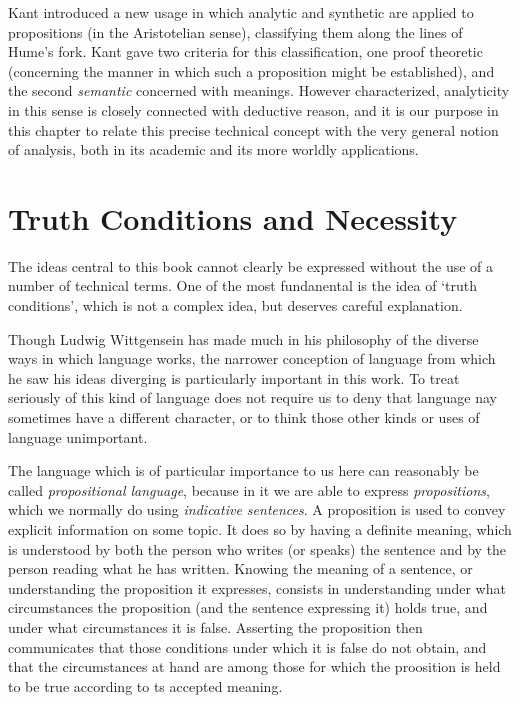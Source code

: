 Kant introduced a new usage in which analytic and
synthetic are applied to propositions (in the Aristotelian sense),
classifying them along the lines of Hume's fork. 
Kant gave two criteria for this classification, one proof theoretic
(concerning the manner in which such a proposition might be
established), and the second \emph{semantic} concerned with meanings. 
However characterized, analyticity in this sense is closely connected
with deductive reason, and it is our purpose in this chapter to relate
this precise technical concept with the very general notion of
analysis, both in its academic and its more worldly applications. 

\section{Truth Conditions and Necessity}\label{TruthConditionsAndNecessity}

The ideas central to this book cannot clearly be expressed without the use of a number of technical terms.
One of the most fundanental is the idea of `truth conditions', which is not a complex idea, but deserves careful explanation.

Though Ludwig Wittgensein has made much in his philosophy of the diverse ways in which language works, the narrower conception of language from which he saw his ideas diverging is particularly important in this work.
To treat seriously of this kind of language does not require us to deny that language nay sometimes have a different character, or to think those other kinds or uses of language unimportant.

The language which is of particular importance to us here can reasonably be called \emph{propositional language}, because in it we are able to express \emph{propositions}, which we normally do using \emph{indicative sentences}.
A proposition is used to convey explicit information on some topic.
It does so by having a definite meaning, which is understood by both the person who writes (or speaks) the sentence and by the person reading what he has written.
Knowing the meaning of a sentence, or understanding the proposition it expresses, consists in understanding under what circumstances the proposition (and the sentence expressing it) holds true, and under what circumstances it is false.
Asserting the proposition then communicates that those conditions under which it is false do not obtain, and that the circumstances at hand are among those for which the proosition is held to be true according to ts accepted meaning.

